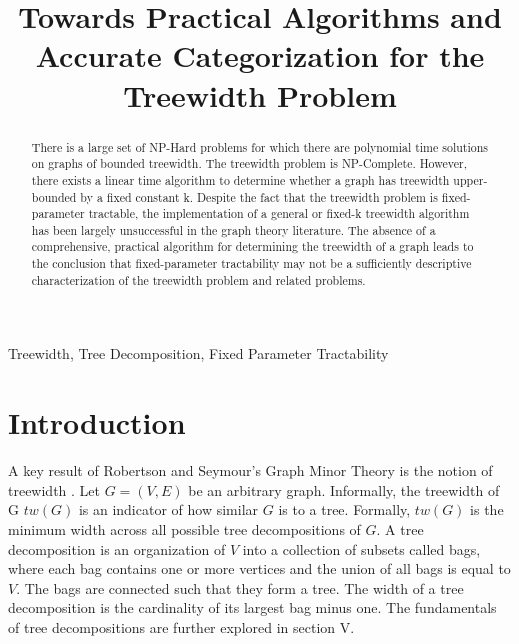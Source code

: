 \documentclass[12pt,conference]{IEEEtran}
\theoremstyle{plain}
\begin{document}
\raggedbottom

\title{Towards Practical Algorithms and Accurate Categorization for the Treewidth Problem}

\author{
}

\maketitle

\begin{abstract}
There is a large set of NP-Hard problems for which there are polynomial time solutions on graphs of bounded treewidth. The treewidth problem is NP-Complete. However, there exists a linear time algorithm to determine whether a graph has treewidth upper-bounded by a fixed constant k. Despite the fact that the treewidth problem is fixed-parameter tractable, the implementation of a general or fixed-k treewidth algorithm has been largely unsuccessful in the graph theory literature. The absence of a comprehensive, practical algorithm for determining the treewidth of a graph leads to the conclusion that fixed-parameter tractability may not be a sufficiently descriptive characterization of the treewidth problem and related problems.
\end{abstract}

\begin{IEEEkeywords}
Treewidth, Tree Decomposition, Fixed Parameter Tractability
\end{IEEEkeywords}

\IEEEpeerreviewmaketitle

\section{Introduction}
A key result of Robertson and Seymour's Graph Minor Theory is the notion of treewidth \cite{treewidth-rob-seymour}. Let $G = (V,E)$ be an arbitrary graph. Informally, the treewidth of G $tw(G)$ is an indicator of how similar $G$ is to a tree. Formally, $tw(G)$ is the minimum width across all possible tree decompositions of $G$. A tree decomposition is an organization of $V$ into a collection of subsets called bags, where each bag contains one or more vertices and the union of all bags is equal to $V$. The bags are connected such that they form a tree. The width of a tree decomposition is the cardinality of its largest bag minus one. The fundamentals of tree decompositions are further explored in section V.
\end{document}
